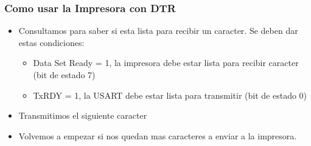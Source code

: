 \documentclass{beamer}
\begin{document}
\begin{frame}[fragile]
\frametitle{Como usar la Impresora con DTR}
\begin{itemize}
 \item  Consultamos para saber si esta lista para recibir un caracter. Se deben dar estas condiciones:
 \begin{itemize}
  \item Data Set Ready = 1, la impresora debe estar lista para recibir caracter (bit de estado 7)
  \item TxRDY = 1, la USART debe estar lista para transmitir (bit de estado 0) 
 \end{itemize}
\item Transmitimos el siguiente caracter 
\item Volvemos a empezar si nos quedan mas caracteres a enviar a la impresora.
\end{itemize}

\end{frame}
\end{document}
